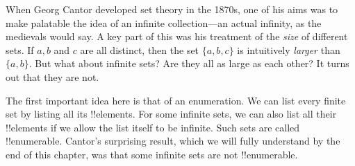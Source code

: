 \documentclass[../../../include/open-logic-section]{subfiles}
\begin{document}

When Georg Cantor developed set theory in the 1870s, one of his aims was
to make palatable the idea of an infinite collection---an
actual infinity, as the medievals would say.  A key part of this was his treatment of the \emph{size} of different sets. If $a, b$ and $c$ are all distinct, then the set $\{a, b, c\}$ is intuitively \emph{larger} than $\{a, b\}$. But what about infinite sets? Are they all as large as each other? It turns out that they are not.

The first important idea here is that of an {enumeration}.  We can list
every finite set by listing all its !!{element}s.  For some infinite sets,
we can also list all their !!{element}s if we allow the list itself to be
infinite. Such sets are called !!{enumerable}. Cantor's surprising
result, which we will fully understand by the end of this chapter, 
was that some infinite sets are not !!{enumerable}.
\end{document}
